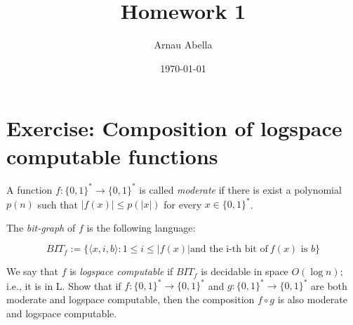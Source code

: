 \documentclass[12pt, a4paper]{article}
\title{Homework 1}
\author{Arnau Abella}
\date{\today}
\begin{document}
\section{Exercise: Composition of logspace computable functions}

A function $f : \{ 0,1 \} ^* \to \{ 0,1 \} ^*$ is called \textit{moderate} if there is exist a polynomial $p(n)$ such that $|f(x)| \leq p(|x|)$ for every $x \in \{ 0, 1 \} ^*$.


The \textit{bit-graph} of $f$ is the following language:


\[
BIT_f := \{  \langle x, i, b\rangle : 1 \leq i \leq |f(x)| \text{and the i-th bit of}\ f(x) \text{ is } b \}
\]


We say that $f$ is \textit{logspace computable} if $BIT_f$ is decidable in space $O(\log n)$; i.e., it is in L. Show that if $f : \{ 0,1 \} ^* \to \{ 0,1 \} ^*$ and $g : \{ 0,1 \} ^* \to \{ 0,1 \} ^*$ are both moderate and logspace computable, then the composition $f \circ g$ is also moderate and logspace computable.
\end{document}
